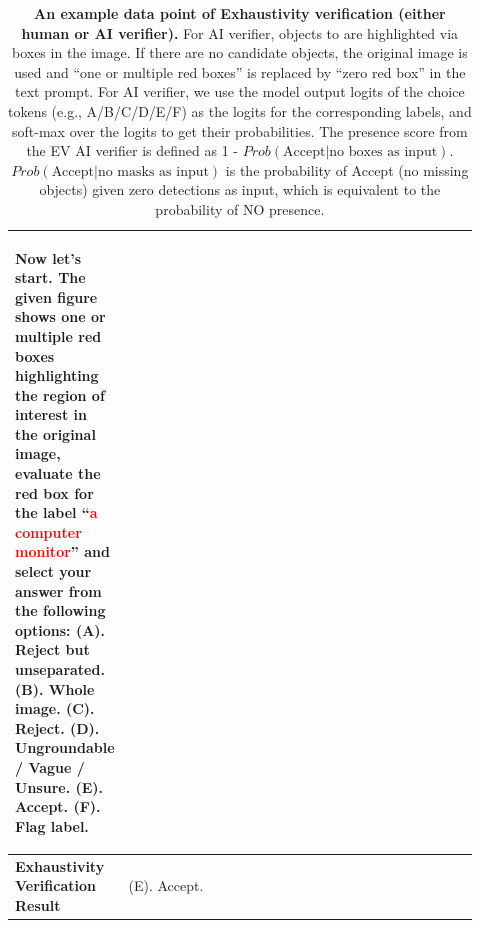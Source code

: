 \documentclass[]{fairmeta}
\begin{document}
\begin{table}[htbp!]
\begin{tabular}{|p{0.12\linewidth}|p{0.8\linewidth}|}
\begin{minipage}[t]{\linewidth}
\begin{enumerate}
			\end{enumerate}
			Now let's start. The given figure shows one or multiple red boxes highlighting the region of interest in the original image, evaluate the red box for the label ``\textcolor{red}{a computer monitor}'' and select your answer from the following options: (A). Reject but unseparated. (B). Whole image. (C). Reject. (D). Ungroundable / Vague / Unsure. (E). Accept. (F). Flag label.
			\vspace{0.2em}
		\end{minipage}
		\\
		\hline
		\textbf{Exhaustivity Verification Result} & \vspace{0.2em} (E). Accept. \\
		\hline
	\end{tabular}
	\caption{\textbf{An example data point of Exhaustivity verification (either human or AI verifier).} For AI verifier, objects to are highlighted via boxes in the image. If there are no candidate objects, the original image is used and ``one or multiple red boxes'' is replaced by ``zero red box'' in the text prompt. For AI verifier, we use the model output logits of the choice tokens (e.g., A/B/C/D/E/F) as the logits for the corresponding labels, and soft-max over the logits to get their probabilities. The presence score from the EV AI verifier is defined as 1 - $Prob(\text{Accept} | \text{no boxes as input})$. $Prob(\text{Accept} | \text{no masks as input})$ is the probability of Accept (no missing objects) given zero detections as input, which is equivalent to the probability of NO presence. }
	\label{tab:ev_llamarater_exp}
\end{table}
\end{document}
